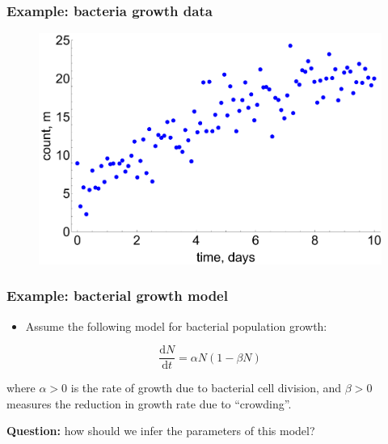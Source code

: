 \documentclass[handout]{beamer}
\begin{document}
\begin{frame}
	\frametitle{Example: bacteria growth data}
	
	\begin{figure}[ht]
		\centerline{\includegraphics[width=1\textwidth]{./Figures/lec7_odeSingle.pdf}}
	\end{figure}
	
\end{frame}

\begin{frame}
	\frametitle{Example: bacterial growth model}
	\begin{itemize}
		\item<2-> Assume the following model for bacterial population growth:
	\end{itemize}
	
	\begin{equation}
	\frac{\mathrm{d}N}{\mathrm{d}t} = \alpha N (1-\beta N)
	\end{equation}
	
	where $\alpha>0$ is the rate of growth due to bacterial cell division, and $\beta>0$ measures the reduction in growth rate due to ``crowding''. 
	
	\textbf{Question:} how should we infer the parameters of this model?
	
\end{frame}
\end{document}
